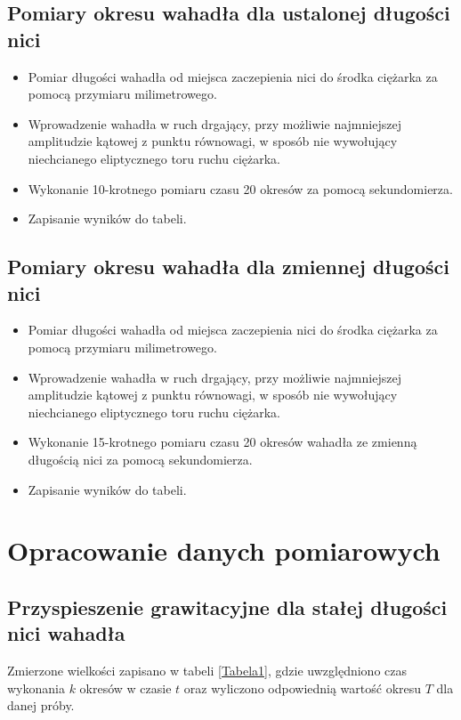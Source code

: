 \documentclass[a4paper,12pts]{article}
\begin{document}
		\subsection{Pomiary okresu wahadła dla ustalonej długości nici}
			\begin{itemize}
				\item Pomiar długości wahadła od miejsca zaczepienia nici do środka ciężarka za pomocą przymiaru milimetrowego.
				\item Wprowadzenie wahadła w ruch drgający, przy możliwie najmniejszej amplitudzie kątowej 	  z punktu równowagi, w sposób nie wywołujący niechcianego eliptycznego toru ruchu 		  ciężarka.
				\item Wykonanie 10-krotnego pomiaru czasu 20 okresów za pomocą sekundomierza.
				\item Zapisanie wyników do tabeli.
			\end{itemize}
		
		\subsection{Pomiary okresu wahadła dla zmiennej długości nici}
			\begin{itemize}
				\item Pomiar długości wahadła od miejsca zaczepienia nici do środka ciężarka za pomocą 		  przymiaru milimetrowego.
				\item Wprowadzenie wahadła w ruch drgający, przy możliwie najmniejszej amplitudzie kątowej 	  z punktu równowagi, w sposób nie wywołujący niechcianego eliptycznego toru ruchu 		  ciężarka.
				\item Wykonanie 15-krotnego pomiaru czasu 20 okresów wahadła ze zmienną długością nici 	  za pomocą sekundomierza.
				\item Zapisanie wyników do tabeli.
			\end{itemize}
	
	
	\section{Opracowanie danych pomiarowych}
	
	\subsection{Przyspieszenie grawitacyjne dla stałej długości nici wahadła}
	Zmierzone wielkości zapisano w tabeli \ref{Tabela1}, gdzie uwzględniono czas wykonania $k$ okresów w czasie $t$ oraz wyliczono odpowiednią wartość okresu $T$ dla danej próby.
	
\end{document}
